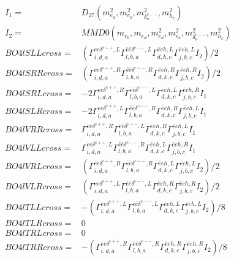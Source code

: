 \documentclass[A4,landscape]{article}
\begin{document}
\begin{align} 
I_1 = & D_{27}(m^2_{e_{{d}}}, m^2_{e_{{b}}}, m^2_{\delta^{c--}_{{a}}}, m^2_{h_{{c}}}) \\ 
I_2 = & MMD0(m_{e_{{b}}}, m_{e_{{d}}}, m^2_{e_{{d}}}, m^2_{e_{{b}}}, m^2_{\delta^{c--}_{{a}}}, m^2_{h_{{c}}}) \\ 
  BO4lSLLcross= & ( \Gamma^{e e \delta^{c++},L}_{i, d, a} \Gamma^{\bar{e}\bar{e}\delta^{c--} ,L}_{l, b, a} \Gamma^{\bar{e}e h ,L}_{d, k, c} \Gamma^{\bar{e}e h ,L}_{j, b, c} I_2)/2 \\ 
  BO4lSRRcross= & ( \Gamma^{e e \delta^{c++},R}_{i, d, a} \Gamma^{\bar{e}\bar{e}\delta^{c--} ,R}_{l, b, a} \Gamma^{\bar{e}e h ,R}_{d, k, c} \Gamma^{\bar{e}e h ,R}_{j, b, c} I_2)/2 \\ 
  BO4lSRLcross= & -2  \Gamma^{e e \delta^{c++},R}_{i, d, a} \Gamma^{\bar{e}\bar{e}\delta^{c--} ,L}_{l, b, a} \Gamma^{\bar{e}e h ,L}_{d, k, c} \Gamma^{\bar{e}e h ,R}_{j, b, c} I_1 \\ 
  BO4lSLRcross= & -2  \Gamma^{e e \delta^{c++},L}_{i, d, a} \Gamma^{\bar{e}\bar{e}\delta^{c--} ,R}_{l, b, a} \Gamma^{\bar{e}e h ,R}_{d, k, c} \Gamma^{\bar{e}e h ,L}_{j, b, c} I_1 \\ 
  BO4lVRRcross= &  \Gamma^{e e \delta^{c++},R}_{i, d, a} \Gamma^{\bar{e}\bar{e}\delta^{c--} ,L}_{l, b, a} \Gamma^{\bar{e}e h ,R}_{d, k, c} \Gamma^{\bar{e}e h ,L}_{j, b, c} I_1 \\ 
  BO4lVLLcross= &  \Gamma^{e e \delta^{c++},L}_{i, d, a} \Gamma^{\bar{e}\bar{e}\delta^{c--} ,R}_{l, b, a} \Gamma^{\bar{e}e h ,L}_{d, k, c} \Gamma^{\bar{e}e h ,R}_{j, b, c} I_1 \\ 
  BO4lVRLcross= & ( \Gamma^{e e \delta^{c++},R}_{i, d, a} \Gamma^{\bar{e}\bar{e}\delta^{c--} ,R}_{l, b, a} \Gamma^{\bar{e}e h ,L}_{d, k, c} \Gamma^{\bar{e}e h ,L}_{j, b, c} I_2)/2 \\ 
  BO4lVLRcross= & ( \Gamma^{e e \delta^{c++},L}_{i, d, a} \Gamma^{\bar{e}\bar{e}\delta^{c--} ,L}_{l, b, a} \Gamma^{\bar{e}e h ,R}_{d, k, c} \Gamma^{\bar{e}e h ,R}_{j, b, c} I_2)/2 \\ 
  BO4lTLLcross= & -( \Gamma^{e e \delta^{c++},L}_{i, d, a} \Gamma^{\bar{e}\bar{e}\delta^{c--} ,L}_{l, b, a} \Gamma^{\bar{e}e h ,L}_{d, k, c} \Gamma^{\bar{e}e h ,L}_{j, b, c} I_2)/8 \\ 
  BO4lTLRcross= & 0 \\ 
  BO4lTRLcross= & 0 \\ 
  BO4lTRRcross= & -( \Gamma^{e e \delta^{c++},R}_{i, d, a} \Gamma^{\bar{e}\bar{e}\delta^{c--} ,R}_{l, b, a} \Gamma^{\bar{e}e h ,R}_{d, k, c} \Gamma^{\bar{e}e h ,R}_{j, b, c} I_2)/8 \\ 
\end{align} 
\end{document}
